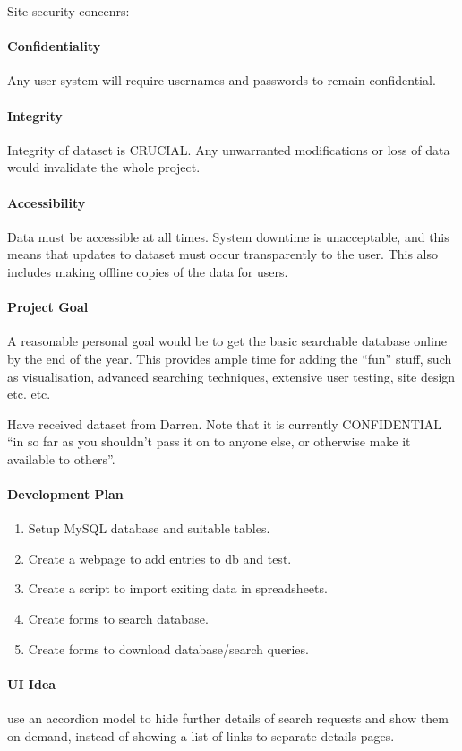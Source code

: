 \noindent
Site security concenrs:

\paragraph{Confidentiality} Any user system will require usernames and passwords
to remain confidential.
\paragraph{Integrity} Integrity of dataset is CRUCIAL. Any unwarranted
modifications or loss of data would invalidate the whole project.
\paragraph{Accessibility} Data must be accessible at all times. System downtime
is unacceptable, and this means that updates to dataset must occur transparently
to the user. This also includes making offline copies of the data for users.

\paragraph{Project Goal} A reasonable personal goal would be to get the basic
searchable database online by the end of the year. This provides ample time for
adding the ``fun'' stuff, such as visualisation, advanced searching techniques,
extensive user testing, site design etc. etc.

Have received dataset from Darren. Note that it is currently CONFIDENTIAL ``in
so far as you shouldn’t pass it on to anyone else, or otherwise make it
available to others''.

\paragraph{Development Plan}
\begin{enumerate}
\item Setup MySQL database and suitable tables.
\item Create a webpage to add entries to db and test.
\item Create a script to import exiting data in spreadsheets.
\item Create forms to search database.
\item Create forms to download database/search queries.
\end{enumerate}

\paragraph{UI Idea} use an accordion model to hide further details of search
requests and show them on demand, instead of showing a list of links to separate
details pages.

